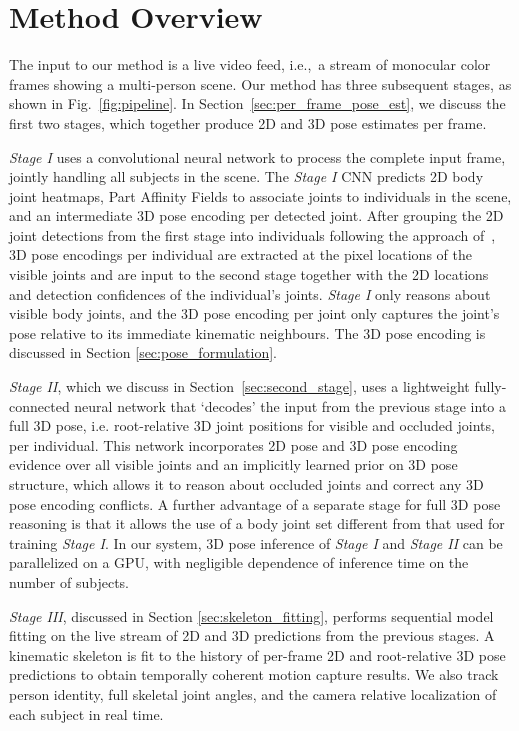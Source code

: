 \documentclass[acmtog,authorversion]{acmart}
\newcommand{\ie}{i.e.,~}
\begin{document}
 \section{Method Overview}
\label{sec:method}
The input to our method is a live video feed, \ie a stream of monocular color frames showing a multi-person scene.
Our method has three subsequent stages, as shown in Fig.~\ref{fig:pipeline}. 
In Section~\ref{sec:per_frame_pose_est}, we discuss the first two stages, which together produce 2D and 3D pose estimates per frame.

\textit{Stage I} uses a convolutional neural network to process the complete input frame, jointly handling all subjects in the scene.
The \textit{Stage I} CNN predicts 2D body joint heatmaps, Part Affinity Fields to associate joints to individuals in the scene, and an intermediate 3D pose encoding per detected joint. 
After grouping the 2D joint detections from the first stage into individuals following the approach of~\cite{cao_affinity_2017}, 3D pose encodings per individual are extracted at the pixel locations of the visible joints and are input to the second stage together with the 2D locations and detection confidences of the individual's joints. \textit{Stage I} only reasons about visible body joints, and the 3D pose encoding per joint only captures the joint's pose relative to its immediate kinematic neighbours. The 3D pose encoding is discussed in Section \ref{sec:pose_formulation}. 

\textit{Stage II}, which we discuss in Section~\ref{sec:second_stage}, uses a lightweight fully-connected neural network that `decodes' the input from the previous stage into a full 3D pose, i.e. root-relative 3D joint positions for visible and occluded joints, per individual.  
This network incorporates 2D pose and 3D pose encoding evidence over all visible joints and an implicitly learned prior on 3D pose structure, which allows it to reason about occluded joints and correct any 3D pose encoding conflicts. 
A further advantage of a separate stage for full 3D pose reasoning is that it allows the use of a body joint set different from that used for training \textit{Stage I}.
In our system, 3D pose inference of \textit{Stage I} and \textit{Stage II} can be parallelized on a GPU, with negligible dependence of inference time on the number of subjects. 

\textit{Stage III}, discussed in Section \ref{sec:skeleton_fitting}, performs sequential model fitting on the live stream of 2D and 3D predictions from the previous stages. 
A kinematic skeleton is fit to the history of per-frame 2D and root-relative 3D pose predictions to obtain temporally coherent motion capture results. 
We also track person identity, full skeletal joint angles, and the camera relative localization of each subject in real time.
\end{document}
